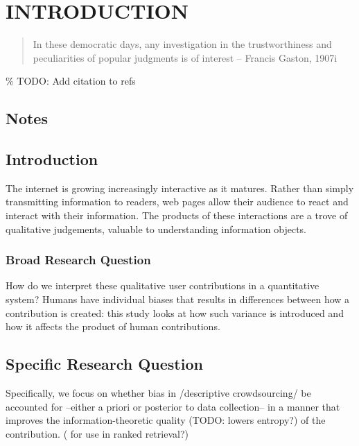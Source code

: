 \chapter{INTRODUCTION}\label{introduction}

\begin{quote}
In these democratic days, any investigation in the trustworthiness and
peculiarities of popular judgments is of interest -- Francis Gaston,
1907i
\end{quote}

\% TODO: Add citation to refs

\section{Notes}\label{notes}

\section{Introduction}\label{introduction-1}

The internet is growing increasingly interactive as it matures. Rather
than simply transmitting information to readers, web pages allow their
audience to react and interact with their information. The products of
these interactions are a trove of qualitative judgements, valuable to
understanding information objects.

\subsection{Broad Research Question}\label{broad-research-question}

How do we interpret these qualitative user contributions in a
quantitative system? Humans have individual biases that results in
differences between how a contribution is created: this study looks at
how such variance is introduced and how it affects the product of human
contributions.

\section{Specific Research Question}\label{specific-research-question}

Specifically, we focus on whether bias in /descriptive crowdsourcing/ be
accounted for --either a priori or posterior to data collection-- in a
manner that improves the information-theoretic quality (TODO: lowers
entropy?) of the contribution. ( for use in ranked retrieval?)

